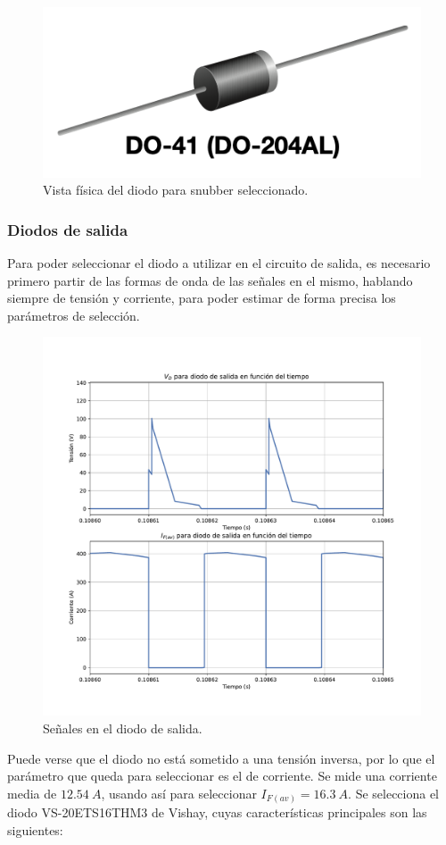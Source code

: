 \begin{figure}
	\centering
	\includegraphics[width=0.3\linewidth]{img/diodo_snu}
	\caption{Vista física del diodo para snubber seleccionado.}
	\label{fig:diodosnu}
\end{figure}


\subsubsection{Diodos de salida}

Para poder seleccionar el diodo a utilizar en el circuito de salida, es necesario primero partir de las formas de onda de las señales en el mismo, hablando siempre de tensión y corriente, para poder estimar de forma precisa los parámetros de selección. 

\begin{figure}
	\centering
	\includegraphics[width=0.8\linewidth]{img/diodo_salida}
	\caption{Señales en el diodo de salida.}
	\label{fig:diodosalida}
\end{figure}

Puede verse que el diodo no está sometido a una tensión inversa, por lo que el parámetro que queda para seleccionar es el de corriente. Se mide una corriente media de $12.54 \ A$, usando así para seleccionar $I_{F(av)}=16.3 \ A$. Se selecciona el diodo VS-20ETS16THM3 de Vishay, cuyas características principales son las siguientes:

